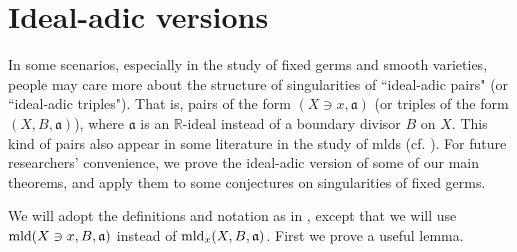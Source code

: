 \documentclass[11pt]{amsart}
\numberwithin{equation}{section}
\newcommand{\Rr}{\mathbb{R}}
\newcommand{\aaa}{\mathfrak{a}}
\newcommand{\mld}{{\rm{mld}}}
\theoremstyle{definition}
\theoremstyle{definition}
\begin{document}
\section{Ideal-adic versions}\label{sec: Ideal-adic versions}

In some scenarios, especially in the study of fixed germs and smooth varieties, people may care more about the structure of singularities of ``ideal-adic pairs" (or ``ideal-adic triples"). That is, pairs of the form $(X\ni x,\aaa)$ (or triples of the form $(X,B,\aaa)$), where $\aaa$ is an $\Rr$-ideal instead of a boundary divisor $B$ on $X$. This kind of pairs also appear in some literature in the study of mlds (cf. \cite{Kaw14,Kaw15b,Nak16,MN18,NS20,Kaw21,NS21}). For future researchers' convenience, we prove the ideal-adic version of some of our main theorems, and apply them to some conjectures on singularities of fixed germs.

We will adopt the definitions and notation as in \cite[Section 2]{Kaw21}, except that we will use $\mld(X\ni x,B,\aaa)$ instead of $\mld_x(X,B,\aaa)$. First we prove a useful lemma.
\end{document}
